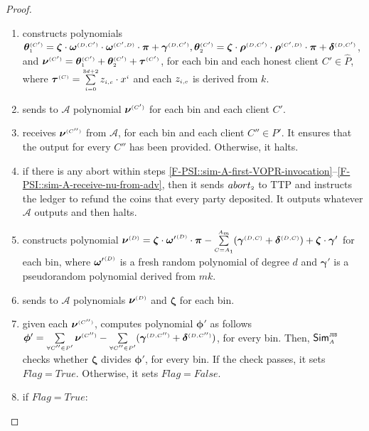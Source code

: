 \begin{proof}
\begin{enumerate}
%
\item constructs polynomials ${\bm\theta}^{ \scriptscriptstyle {  {(C')}}}_{\scriptscriptstyle 1}={\bm\zeta} \cdot {\bm\omega}^{ \scriptscriptstyle {  {(D,C')}}}\cdot {\bm\omega}^{ \scriptscriptstyle {  {(C',D)}}}\cdot {\bm\pi}+{\bm\gamma}^{ \scriptscriptstyle {  {(D,C')}}}, {\bm\theta}^{ \scriptscriptstyle {  {(C')}}}_{\scriptscriptstyle 2}=  {\bm\zeta} \cdot  {\bm\rho}^{ \scriptscriptstyle {  {(D,C')}}}\cdot  {\bm\rho}^{ \scriptscriptstyle {  {(C',D)}}}\cdot  {\bm\pi}+  {\bm\delta}^{ \scriptscriptstyle {  {(D,C')}}}$, and $ {\bm\nu}^{ \scriptscriptstyle {  {(C')}} }=  {\bm\theta}^{ \scriptscriptstyle {  {(C')}}}_{\scriptscriptstyle 1}+ {\bm\theta}^{ \scriptscriptstyle {  {(C')}}}_{\scriptscriptstyle 2}+ {\bm \tau}^{ \scriptscriptstyle {  {(C')}} }$, for each bin and each honest client $C'\in\hat P$, where $ {\bm\tau}^{ \scriptscriptstyle {  {(C)}}}=\sum\limits^{\scriptscriptstyle 3d+2}_{\scriptscriptstyle i=0}z_{\scriptscriptstyle i,c}\cdot x^{\scriptscriptstyle i}$ and each $z_{\scriptscriptstyle i,c}$ is derived from $  k$. 
%
\item sends to $\mathcal{A}$ polynomial  $ {\bm\nu}^{ \scriptscriptstyle {  {(C')}} }$ for each bin and each client $C'$. 
%
\item\label{F-PSI::sim-A-receive-nu-from-adv} receives $ {\bm\nu}^{ \scriptscriptstyle {  {(C'')}} }$  from $\mathcal{A}$, for each bin and each client $C''\in P'$. It ensures that the output for every $C''$ has been provided. Otherwise, it halts. 
%
\item if there is any abort within steps \ref{F-PSI::sim-A-first-VOPR-invocation}--\ref{F-PSI::sim-A-receive-nu-from-adv}, then it sends $abort_{\scriptscriptstyle 2}$ to TTP and instructs the ledger to refund the coins that every party deposited.  It outputs whatever $\mathcal{A}$ outputs and then halts. 
%
\item constructs polynomial  $ {\bm\nu}^{ \scriptscriptstyle {  {(D)}}}= {\bm\zeta} \cdot   {\bm\omega'}^{ \scriptscriptstyle {  {(D)}}}\cdot  {\bm\pi} - \sum\limits^{ \scriptscriptstyle {   A}_{ \scriptscriptstyle {   m}}}_{  \scriptscriptstyle {  {C }= }  \scriptscriptstyle {   A}_{ \scriptscriptstyle {  1}}}( {\bm\gamma}^{ \scriptscriptstyle {  {(D,C)}}} +  {\bm\delta}^{ \scriptscriptstyle {  {(D,C)}}}) +  {\bm\zeta} \cdot  {\bm\gamma'}$ for each bin, where $ {\bm\omega'}^{ \scriptscriptstyle {  {(D)}}}$ is a fresh random polynomial of degree $d$ and $ {\bm\gamma'}$ is a pseudorandom polynomial derived from $  {mk}$.
%
\item sends to $\mathcal{A}$ polynomials $ {\bm\nu}^{ \scriptscriptstyle {  {(D)}}}$ and $ {\bm\zeta}$ for each bin. 
%
\item given each $ {\bm\nu}^{ \scriptscriptstyle {  {(C'')}} }$, computes polynomial $ {\bm\phi'}$ as follows $ {\bm\phi'} = \sum\limits_{\scriptscriptstyle \forall C''\in P'} {\bm\nu}^{ \scriptscriptstyle {  {(C'')}} }- \sum\limits_{\scriptscriptstyle \forall C''\in P'}( {\bm\gamma}^{ \scriptscriptstyle {  {(D,C'')}}} +  {\bm\delta}^{ \scriptscriptstyle {  {(D,C'')}}})$, for every bin. Then, $\mathsf{Sim}^{\scriptscriptstyle \mathtt{JUS}}_{\scriptscriptstyle A}$ checks whether  $ {\bm\zeta}$  divides ${\bm\phi'}$, for every bin. If the check passes, it sets $Flag=True$. Otherwise, it sets $Flag=False$. 
%
\item if $Flag=True$:


\end{enumerate}
\end{proof}
